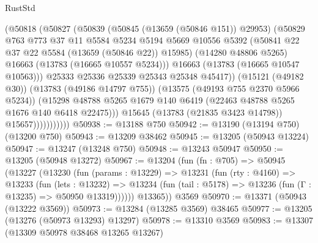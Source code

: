 \begin{lexlean}{RustStd}
\begin{coremodule}
                            (@50818
                              (@50827
                                (@50839
                                  (@50845 (@13659 (@50846 @151)) @29953)
                                  (@50829
                                    @763
                                    @773
                                    @37
                                    @11
                                    @5584
                                    @5234
                                    @5194
                                    @5669
                                    @10556
                                    @5392
                                    (@50841 @22 @37 @22 @5584 (@13659 (@50846 @22)) @15985)
                                    (@14280 @48806 @5265)
                                    @16663
                                    (@13783 (@16665 @10557 @5234)))
                                  @16663
                                  (@13783 (@16665 @10547 @10563)))
                                @25333
                                @25336
                                @25339
                                @25343
                                @25348
                                @45417))
                            (@15121 (@49182 @30))
                            (@13783 (@49186 @14797 @755))
                            (@13575 (@49193 @755 @2370 @5966 @5234))
                            (@15298
                              @48788
                              @5265
                              @1679
                              @140
                              @6419
                              (@22463 @48788 @5265 @1676 @140 @6418 @22475)))
                          @15645
                          (@13783 (@21835 @3423 @14798))
                          @15657)))))))))))
@50938 := @13188 @750
@50942 := @13190 (@13194 @750) (@13200 @750)
@50943 := @13209 @38462
@50945 := @13205 (@50943 @13224)
@50947 := @13247 (@13248 @750)
@50948 := @13243 @50947
@50950 := @13205 (@50948 @13272)
@50967 := @13204
    (fun (fn : @705) =>
    @50945
      (@13227
        (@13230
          (fun (params : @13229) =>
          @13231
            (fun (rty : @4160) =>
            @13233
              (fun (lets : @13232) =>
              @13234 (fun (tail : @5178) => @13236 (fun (Γ : @13235) => @50950 @13319))))))
        @13365))
    @3569
@50970 := @13371 (@50943 (@13222 @3569))
@50973 := @13284 (@13285 @3569) @38465
@50977 := @13205 (@13276 (@50973 @13293) @13297)
@50978 := @13310 @3569
@50983 := @13307 (@13309 @50978 @38468 @13265 @13267)

\end{coremodule}
\end{lexlean}

